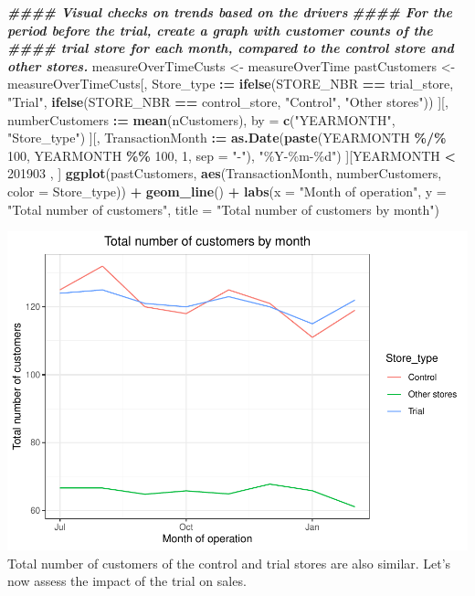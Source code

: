 \documentclass[
]{article}
\newenvironment{Shaded}{\begin{snugshade}}{\end{snugshade}}
\newcommand{\AttributeTok}[1]{\textcolor[rgb]{0.13,0.29,0.53}{#1}}
\newcommand{\DecValTok}[1]{\textcolor[rgb]{0.00,0.00,0.81}{#1}}
\newcommand{\DocumentationTok}[1]{\textcolor[rgb]{0.56,0.35,0.01}{\textbf{\textit{#1}}}}
\newcommand{\FunctionTok}[1]{\textcolor[rgb]{0.13,0.29,0.53}{\textbf{#1}}}
\newcommand{\NormalTok}[1]{#1}
\newcommand{\OtherTok}[1]{\textcolor[rgb]{0.56,0.35,0.01}{#1}}
\newcommand{\SpecialCharTok}[1]{\textcolor[rgb]{0.81,0.36,0.00}{\textbf{#1}}}
\newcommand{\StringTok}[1]{\textcolor[rgb]{0.31,0.60,0.02}{#1}}
\begin{document}
\begin{Shaded}
\begin{Highlighting}[]
\DocumentationTok{\#\#\#\# Visual checks on trends based on the drivers}
\DocumentationTok{\#\#\#\# For the period before the trial, create a graph with customer counts of the}
\DocumentationTok{\#\#\#\# trial store for each month, compared to the control store and other stores.}
\NormalTok{measureOverTimeCusts }\OtherTok{\textless{}{-}}\NormalTok{ measureOverTime}
\NormalTok{pastCustomers }\OtherTok{\textless{}{-}}\NormalTok{ measureOverTimeCusts[, Store\_type }\SpecialCharTok{:=} \FunctionTok{ifelse}\NormalTok{(STORE\_NBR }\SpecialCharTok{==}\NormalTok{ trial\_store, }\StringTok{"Trial"}\NormalTok{,}
\FunctionTok{ifelse}\NormalTok{(STORE\_NBR }\SpecialCharTok{==}\NormalTok{ control\_store, }\StringTok{"Control"}\NormalTok{, }\StringTok{"Other stores"}\NormalTok{))}
\NormalTok{][, numberCustomers }\SpecialCharTok{:=} \FunctionTok{mean}\NormalTok{(nCustomers), by }\OtherTok{=} \FunctionTok{c}\NormalTok{(}\StringTok{"YEARMONTH"}\NormalTok{, }\StringTok{"Store\_type"}\NormalTok{)}
\NormalTok{][, TransactionMonth }\SpecialCharTok{:=} \FunctionTok{as.Date}\NormalTok{(}\FunctionTok{paste}\NormalTok{(YEARMONTH }\SpecialCharTok{\%/\%}
                                        \DecValTok{100}\NormalTok{, YEARMONTH }\SpecialCharTok{\%\%} \DecValTok{100}\NormalTok{, }\DecValTok{1}\NormalTok{, }\AttributeTok{sep =} \StringTok{"{-}"}\NormalTok{), }\StringTok{"\%Y{-}\%m{-}\%d"}\NormalTok{)}
\NormalTok{][YEARMONTH }\SpecialCharTok{\textless{}} \DecValTok{201903}\NormalTok{ , ]}
\FunctionTok{ggplot}\NormalTok{(pastCustomers, }\FunctionTok{aes}\NormalTok{(TransactionMonth, numberCustomers, }\AttributeTok{color =}\NormalTok{ Store\_type)) }\SpecialCharTok{+} 
  \FunctionTok{geom\_line}\NormalTok{() }\SpecialCharTok{+} \FunctionTok{labs}\NormalTok{(}\AttributeTok{x =} \StringTok{"Month of operation"}\NormalTok{, }\AttributeTok{y =} \StringTok{"Total number of customers"}\NormalTok{, }\AttributeTok{title =} \StringTok{"Total number of customers by month"}\NormalTok{)}
\end{Highlighting}
\end{Shaded}

\includegraphics{InsideSherpa_Task2_files/figure-latex/unnamed-chunk-23-1.pdf}
Total number of customers of the control and trial stores are also
similar. Let's now assess the impact of the trial on sales.
\end{document}
